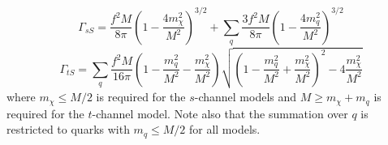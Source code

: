 \begin{flushleft}
\begin{equation}
\end{equation}
\begin{equation}
\label{gamma_sS}
\Gamma_{sS} = \frac{f^{2} M}{8\pi}\left(1 - \frac{4m_{\chi}^{2}}{M^{2}}\right)^{3/2} + \sum_{\substack{q}}\frac{3f^{2} M}{8\pi}\left(1 - \frac{4m_{q}^{2}}{M^{2}}\right)^{3/2}
\end{equation}
\begin{equation}
\label{gamma_tS}
\Gamma_{tS} = \sum_{\substack{q}} \frac{f^{2}M}{16\pi}\left(1 - \frac{m_{q}^{2}}{M^{2}} - \frac{m_{\chi}^{2}}{M^{2}}\right)\sqrt{\left(1 - \frac{m_{q}^{2}}{M^{2}} + \frac{m_{\chi}^{2}}{M^{2}}\right)^{2} - 4\frac{m_{\chi}^{2}}{M^{2}}}
\end{equation}
where $m_{\chi} \leq M/2$ is required for the $s$-channel models and $M \geq m_{\chi} + m_{q}$ is required for the $t$-channel model. Note also that the summation over $q$ is restricted to quarks with $m_{q} \leq M/2$ for all models. 

\end{flushleft}


